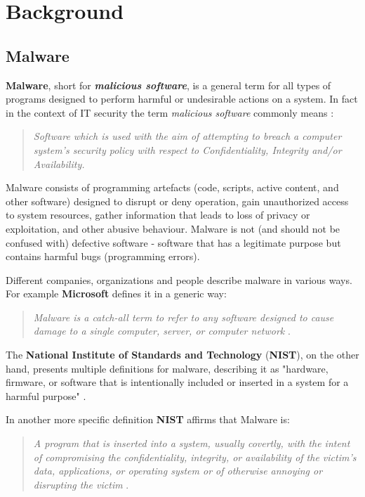 \documentclass[pdfa%
,cucitura%
]{toptesi}
\begin{document}
\chapter{Background}

\section{Malware}
\textbf{Malware}, short for \textbf{\textit{malicious software}}, is a general term for all types of programs designed to perform harmful or undesirable actions on a system. In fact in the context of IT security the term \textit{malicious software} commonly means \cite{SharpAIM}:

\begin{quote}
	\textit{Software which is used with the aim of attempting to breach a computer system's security policy with respect to Confidentiality, Integrity and/or Availability.}
\end{quote}

Malware consists of programming artefacts (code, scripts, active content, and other software) designed to disrupt or deny operation, gain unauthorized access to system resources, gather information that leads to loss of privacy or exploitation, and other abusive behaviour.
Malware is not (and should not be confused with) defective software - software that has a legitimate purpose but contains harmful bugs (programming errors).

Different companies, organizations and people describe malware in various ways. For example \textbf{Microsoft} defines it in a generic way:

\begin{quote}
	\textit{Malware is a catch-all term to refer to any software designed to cause damage to a single computer, server, or computer network} \cite{MoirDM}.
\end{quote}

The \textbf{National Institute of Standards and Technology} (\textbf{NIST}), on the other hand, presents multiple definitions for malware, describing it as "hardware, firmware, or software that is intentionally included or inserted in a system for a harmful purpose" \cite{nistM}.

In another more specific definition \textbf{NIST} affirms that Malware is:

\begin{quote}
	\textit{A program that is inserted into a system, usually covertly, with the intent of compromising the confidentiality, integrity, or availability of the victim's data, applications, or operating system or of otherwise annoying or disrupting the victim} \cite{nistM}.
\end{quote}
\end{document}
